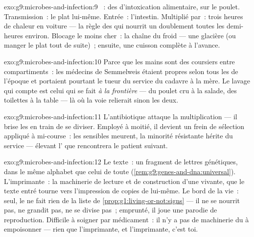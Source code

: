 \begin{solution}{exo:g9:microbes-and-infection:9}
~: des  d'intoxication alimentaire,
sur le poulet. Transmission~: le plat lui-même. Entrée~:
l'intestin. Multiplié par~: trois heures de chaleur en
voiture --- la règle des  qui nourrit un
doublement toutes les demi-heures environ. Blocage le moins
cher~: la chaîne du froid --- une glacière (ou manger le
plat tout de suite)~; ensuite, une cuisson complète à
l'avance.
\end{solution}

\begin{solution}{exo:g9:microbes-and-infection:10}
Parce que les mains sont des coursiers entre compartiments~:
les médecins de Semmelweis étaient propres selon tous les
 de l'époque et portaient pourtant le tueur du
service du cadavre à la mère. Le lavage qui compte est celui
qui se fait \emph{à la frontière} --- du poulet cru à la
salade, des toilettes à la table --- là où la voie
relierait sinon les deux.
\end{solution}

\begin{solution}{exo:g9:microbes-and-infection:11}
L'antibiotique attaque la multiplication --- il brise les
 en train de se diviser. Employé à moitié, il
devient un frein de sélection appliqué à mi-course~: les
sensibles meurent, la minorité résistante hérite du
service --- élevant l' que rencontrera le
patient suivant.
\end{solution}

\begin{solution}{exo:g9:microbes-and-infection:12}
Le texte~: un fragment de lettres génétiques, dans le même
alphabet que celui de toute 
(\cref{rem:g9:genes-and-dna:universal}). L'imprimante~: la
machinerie de lecture et de construction d'une 
vivante, que le texte entré tourne vers l'impression de
copies de lui-même. Le bord de la vie~: seul, le  ne
fait rien de la liste de
\cref{prop:g1:living-or-not:signs} --- il ne se nourrit
pas, ne grandit pas, ne se divise pas~; emprunté, il joue
une parodie de reproduction. Difficile à soigner par
médicament~: il n'y a pas de machinerie du  à
empoisonner --- rien que l'imprimante, et l'imprimante,
c'est toi.
\end{solution}

